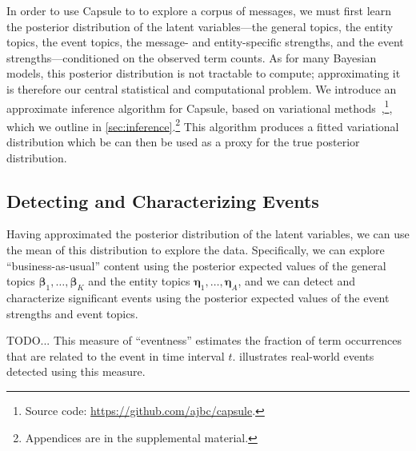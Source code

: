 In order to use Capsule to to explore a corpus of messages, we must
first learn the posterior distribution of the latent variables---the
general topics, the entity topics, the event topics, the message- and
entity-specific strengths, and the event strengths---conditioned on
the observed term counts. As for many Bayesian models, this posterior
distribution is not tractable to compute; approximating it is
therefore our central statistical and computational problem. We
introduce an approximate inference algorithm for Capsule, based on
variational methods~\cite{Jordan:1999},\footnote{Source code:
  \url{https://github.com/ajbc/capsule}.}, which we outline in
\cref{sec:inference}.\footnote{Appendices are in the supplemental
  material.} This algorithm produces a fitted variational distribution
which be can then be used as a proxy for the true posterior
distribution.

\subsection{Detecting and Characterizing Events}
\label{sec:detecting}

Having approximated the posterior distribution of the latent
variables, we can use the mean of this distribution to explore the
data. Specifically, we can explore ``business-as-usual'' content using
the posterior expected values of the general topics
$\mathbold{\beta}_1, \ldots, \mathbold{\beta}_K$ and the entity topics
$\mathbold{\eta}_1, \ldots, \mathbold{\eta}_A$, and we can detect and
characterize significant events using the posterior expected values of
the event strengths and event topics.


TODO... This measure of ``eventness'' estimates the fraction of term
occurrences that are related to the event in time interval
$t$.  illustrates real-world events detected
using this measure.

